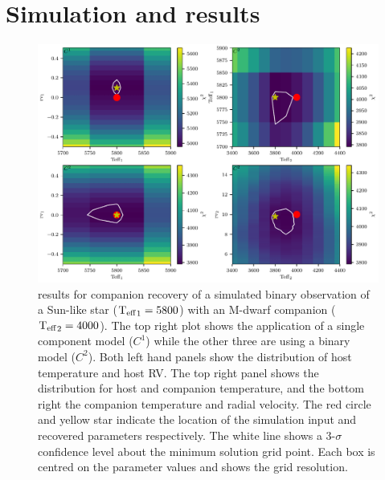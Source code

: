 
\section{Simulation and results}
\label{sec:chi2_results}



\begin{figure}
    \centering
    \includegraphics[width=0.7\linewidth]{figures/companion_recovery/Mdwarf_pcolors}
    \caption[\textchisquared{} contour for companion recovery of a simulated Sun - M-dwarf binary.]{\textchisquared{} results for companion recovery of a simulated binary observation of a Sun-like star (\({\textrm{T}_{\mathrm{eff}}}_{1}=5800\)\K{}) with an M-dwarf companion (\({\textrm{T}_{\mathrm{eff}}}_{2}=4000\)\K{}).
        The top right plot shows the application of a single component model (\(C^1\)) while the other three are using a binary model (\(C^2\)).
        Both left hand panels show the distribution of host temperature and host {RV}.
        The top right panel shows the distribution for host and companion temperature, and the bottom right the companion temperature and radial velocity.
        The red circle and yellow star indicate the location of the simulation input and recovered parameters respectively.
        The white line shows a 3-\(\sigma\) confidence level about the minimum \textchisquared{} solution grid point.
        Each box is centred on the parameter values and shows the grid resolution.}
    \label{fig:Mdwarf_contours}
\end{figure}

